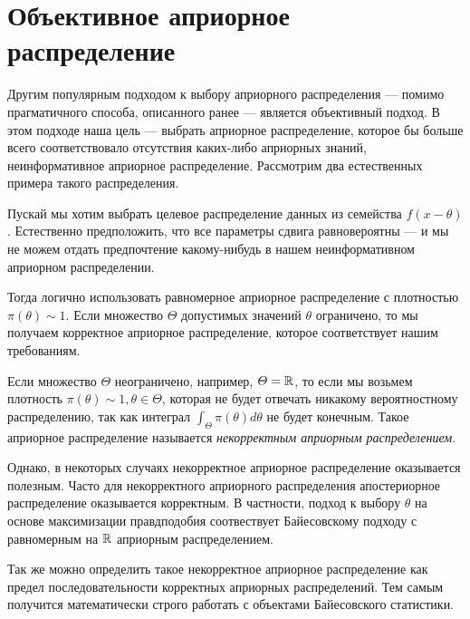 \section{Объективное априорное распределение}

Другим популярным подходом к выбору априорного распределения 
--- помимо прагматичного способа, описанного ранее --- является объективный подход.
В этом подходе наша цель --- выбрать априорное распределение,
которое бы больше всего соответствовало отсутствия каких-либо априорных знаний, неинформативное априорное распределение.
Рассмотрим два естественных примера такого распределения.

\begin{example}
Пускай мы хотим выбрать целевое распределение данных из семейства $f(x - \theta)$. 
Естественно предположить, что все параметры сдвига равновероятны --- и мы не можем отдать предпочтение какому-нибудь в нашем неинформативном априорном распределении.

Тогда логично использовать равномерное априорное распределение с плотностью $\pi(\theta) \sim 1$.
Если множество $\Theta$ допустимых значений $\theta$ ограничено, то мы получаем корректное априорное распределение, 
которое соответствует нашим требованиям.

Если множество $\Theta$ неограничено, например, $\varTheta = \mathbb{R}$, то если мы возьмем плотность $\pi(\theta) \sim 1, \theta \in \Theta$,
которая не будет отвечать никакому вероятностному распределению, так как интеграл $\int_{\Theta} \pi(\theta) d\theta$ не будет конечным.
Такое априорное распределение называется \emph{некорректным априорным распределением}.

Однако, в некоторых случаях некорректное априорное распределение оказывается полезным.
Часто для некорректного априорного распределения апостериорное распределение оказывается корректным.
В частности, подход к выбору $\theta$ на основе максимизации правдподобия соотвествует Байесовскому подходу с равномерным на $\mathbb{R}$ 
априорным распределением.

Так же можно определить такое некорректное априорное распределение как предел последовательности корректных априорных распределений.
Тем самым получится математически строго работать с объектами Байесовского статистики.
\end{example}


